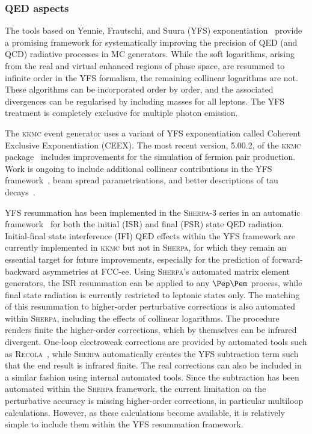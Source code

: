 \subsubsection{QED aspects}
\label{sec:EWmc}

The tools based on Yennie, Frautschi, and Suura (YFS) exponentiation~\cite{Yennie:1961ad} 
provide a promising framework for systematically improving the precision of QED (and QCD) radiative processes in MC generators. 
While the soft logarithms, arising from the real and virtual enhanced regions of phase space, 
are resummed to infinite order in the YFS formalism, the remaining collinear logarithms are not. 
These algorithms can be incorporated order by order, 
and the associated divergences can be regularised by including masses for all leptons. 
The YFS treatment is completely exclusive for multiple photon emission.

The \textsc{kkmc} event generator uses a variant of YFS exponentiation called Coherent Exclusive Exponentiation (CEEX). 
The most recent version, 5.00.2, of the \textsc{kkmc} package~\cite{Arbuzov:2020coe} includes improvements for the simulation of fermion pair production. 
Work is ongoing to include additional collinear contributions in the YFS framework~\cite{Jadach:2023pka}, 
beam spread parametrisations, and better descriptions of tau decays~\cite{Banerjee:2019mle}.

YFS resummation has been implemented in the {\textsc{Sherpa}}-3 series in an automatic framework~\cite{Krauss:2022ajk} 
for both the initial (ISR) and final (FSR) state QED radiation. 
Initial-final state interference (IFI) QED effects within the YFS framework are currently  implemented in \textsc{kkmc} but not in \textsc{Sherpa}, 
for which they remain an essential target for future improvements,
especially for the prediction of  forward-backward asymmetries at FCC-ee.
Using {\textsc{Sherpa}}'s automated matrix element generators, the ISR resummation can be applied to any $\epem$ process, 
while final state radiation is currently restricted to leptonic states only. 
The matching of this resummation to higher-order perturbative corrections is also automated within {\textsc{Sherpa}}, 
including the effects of collinear logarithms. 
The procedure renders finite the higher-order corrections, which by themselves can be infrared divergent. 
One-loop electroweak corrections are provided by automated tools such as \textsc{Recola}~\cite{Actis:2016mpe}, 
while {\textsc{Sherpa}} automatically creates the YFS subtraction term such that the end result is infrared finite. 
The real corrections can also be included in a similar fashion using internal automated tools. 
Since the subtraction has been automated within the \textsc{Sherpa} framework, 
the current limitation on the perturbative accuracy is missing higher-order corrections, in particular multiloop calculations. 
However, as these calculations become available, it is relatively simple to include them within the YFS resummation framework.

